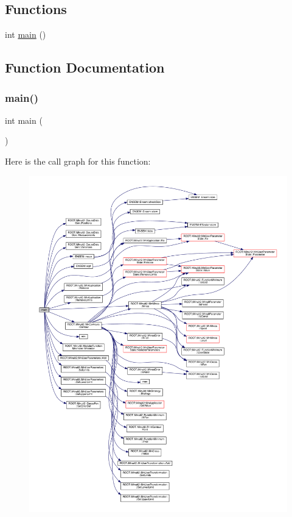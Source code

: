 \subsection*{Functions}
\begin{DoxyCompactItemize}
\item 
int \mbox{\hyperlink{adat-devel_2other__libs_2minuit_2test_2MnSim_2DemoGaussSim_8cxx_ae66f6b31b5ad750f1fe042a706a4e3d4}{main}} ()
\end{DoxyCompactItemize}


\subsection{Function Documentation}
\mbox{\label{adat-devel_2other__libs_2minuit_2test_2MnSim_2DemoGaussSim_8cxx_ae66f6b31b5ad750f1fe042a706a4e3d4}} 
\subsubsection{\texorpdfstring{main()}{main()}}
{\footnotesize\ttfamily int main (\begin{DoxyParamCaption}{ }\end{DoxyParamCaption})}

Here is the call graph for this function\+:
\nopagebreak
\begin{figure}[H]
\begin{center}
\leavevmode
\includegraphics[width=350pt]{d3/d74/adat-devel_2other__libs_2minuit_2test_2MnSim_2DemoGaussSim_8cxx_ae66f6b31b5ad750f1fe042a706a4e3d4_cgraph}
\end{center}
\end{figure}
